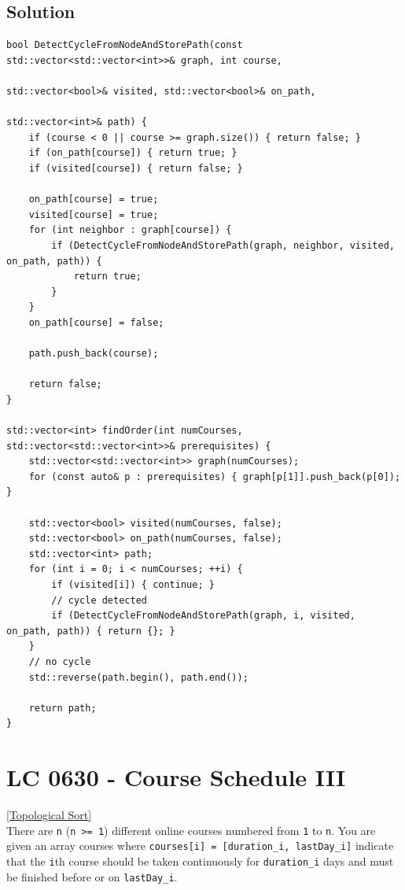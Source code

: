 \subsection*{Solution}
\begin{lstlisting}
bool DetectCycleFromNodeAndStorePath(const std::vector<std::vector<int>>& graph, int course,
																		 std::vector<bool>& visited, std::vector<bool>& on_path, 
																		 std::vector<int>& path) {
	if (course < 0 || course >= graph.size()) { return false; }
	if (on_path[course]) { return true; }
	if (visited[course]) { return false; }
	
	on_path[course] = true;
	visited[course] = true;
	for (int neighbor : graph[course]) {
		if (DetectCycleFromNodeAndStorePath(graph, neighbor, visited, on_path, path)) { 
			return true; 
		}
	}
	on_path[course] = false;
	
	path.push_back(course);
	
	return false;
}

std::vector<int> findOrder(int numCourses, std::vector<std::vector<int>>& prerequisites) {
	std::vector<std::vector<int>> graph(numCourses);
	for (const auto& p : prerequisites) { graph[p[1]].push_back(p[0]); }
	
	std::vector<bool> visited(numCourses, false);
	std::vector<bool> on_path(numCourses, false);
	std::vector<int> path;
	for (int i = 0; i < numCourses; ++i) {
		if (visited[i]) { continue; }
		// cycle detected
		if (DetectCycleFromNodeAndStorePath(graph, i, visited, on_path, path)) { return {}; }
	}
	// no cycle
	std::reverse(path.begin(), path.end());
	
	return path;
}
\end{lstlisting}

\section{LC 0630 - Course Schedule III}\label{lc0630}
{\hyperref[sec:topological_sort]{[Topological Sort]}}\\

There are {\colorbox{CodeBackground}{\lstinline|n|}} ({\colorbox{CodeBackground}{\lstinline|n >= 1|}}) different online courses numbered from {\colorbox{CodeBackground}{\lstinline|1|}} to {\colorbox{CodeBackground}{\lstinline|n|}}. You are given an array courses where {\colorbox{CodeBackground}{\lstinline|courses[i] = [duration_i, lastDay_i]|}} indicate that the {\colorbox{CodeBackground}{\lstinline|i|}}th course should be taken continuously for {\colorbox{CodeBackground}{\lstinline|duration_i|}} days and must be finished before or on {\colorbox{CodeBackground}{\lstinline|lastDay_i|}}.\\

